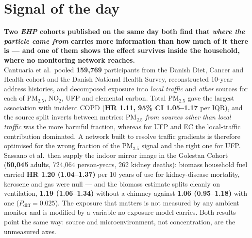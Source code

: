 \documentclass[10pt]{article}
\begin{document}
\vspace{6mm}

\section*{\sffamily\bfseries\color{Deep}Signal of the day}
\vspace{-1.5mm}{\color{Amber}\rule{\linewidth}{1.1pt}}\vspace{2.5mm}

\begin{keybox}
{\sffamily\bfseries\small\color{Deep}Two \textit{EHP} cohorts published on the same day
both find that \emph{where the particle came from} carries more information than how much
of it there is --- and one of them shows the effect survives inside the household, where
no monitoring network reaches.}\\[1.4mm]
\footnotesize
Cantuaria et al.\ pooled \textbf{159{,}769} participants from the Danish Diet, Cancer and
Health cohort and the Danish National Health Survey, reconstructed 10-year address
histories, and decomposed exposure into \emph{local traffic} and \emph{other} sources for
each of PM$_{2.5}$, NO$_2$, UFP and elemental carbon. Total PM$_{2.5}$ gave the largest
association with incident COPD (\textbf{HR 1.11, 95\% CI 1.05--1.17} per IQR), and the
source split inverts between metrics: PM$_{2.5}$ \emph{from sources other than local
traffic} was the more harmful fraction, whereas for UFP and EC the local-traffic
contribution dominated. A network built to resolve traffic gradients is therefore
optimised for the wrong fraction of the PM$_{2.5}$ signal and the right one for UFP.
Sassano et al.\ then supply the indoor mirror image in the Golestan Cohort
(\textbf{50{,}045} adults, 724{,}064 person-years, 262 kidney deaths): biomass household
fuel carried \textbf{HR 1.20 (1.04--1.37)} per 10 years of use for kidney-disease
mortality, kerosene and gas were null --- and the biomass estimate splits cleanly on
ventilation, \textbf{1.19 (1.06--1.34)} without a chimney against \textbf{1.06
(0.95--1.18)} with one ($P_{\text{diff}}=0.025$). The exposure that matters is not
measured by any ambient monitor and is modified by a variable no exposure model carries.
Both results point the same way: source and microenvironment, not concentration, are the
unmeasured axes.
\end{keybox}

\vspace{3mm}
\end{document}
